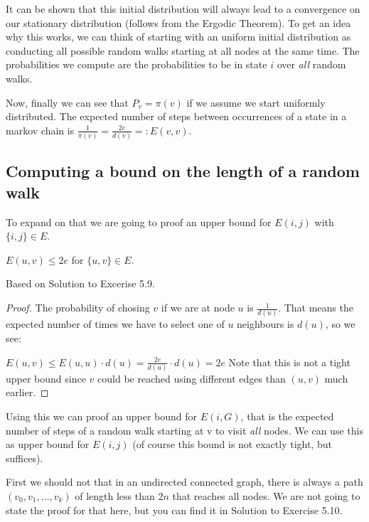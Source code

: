 It can be shown that this initial distribution will always lead to a
convergence on our stationary distribution (follows from the Ergodic
Theorem). To get an idea why this works, we can think of starting with
an uniform initial distribution as conducting all possible random walks
starting at all nodes at the same time. The probabilities we compute are
the probabilities to be in state $i$ over \emph{all} random walks.

Now, finally we can see that $P_v = \pi(v)$ if we assume we start
uniformly distributed. The expected number of steps between occurrences
of a state in a markov chain is
$\frac{1}{\pi(v)} = \frac{2e}{d(v)} =: E(v, v)$.

\subsection{Computing a bound on the length of a random
walk}\label{computing-a-bound-on-the-length-of-a-random-walk}

To expand on that we are going to proof an upper bound for $E(i, j)$
with $\{i, j\} \in E$.

\vspace{0.5cm}

\begin{thm}
$E(u, v) \leq 2e$ for $\{u, v\} \in E$.
\end{thm}

Based on  Solution to Excerise
5.9.

\begin{proof}
The probability of chosing $v$ if we are at node $u$ is $\frac{1}{d(u)}$.
That means the expected number of times we have to select one of $u$ neighbours is $d(u)$,
so we see:

$E(u, v) \leq E(u, u) \cdot d(u) = \frac{2e}{d(u)} \cdot d(u) = 2e$
Note that this is not a tight upper bound since $v$ could be reached using different edges than $(u, v)$ much earlier.
\end{proof}

Using this we can proof an upper bound for $E(i, G)$, that is the
expected number of steps of a random walk starting at v to visit
\emph{all} nodes. We can use this as upper bound for $E(i, j)$ (of
course this bound is not exactly tight, but suffices).

First we should not that in an undirected connected graph, there is
always a path $(v_0, v_1, \dots, v_k)$ of length less than $2n$ that
reaches all nodes. We are not going to state the proof for that here,
but you can find it in  Solution
to Exercise 5.10.


